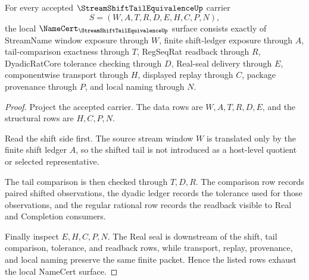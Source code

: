 \begin{theorem}
\label{thm:stream-shift-tail-equivalence-namecert-obligations}
For every accepted $\StreamShiftTailEquivalenceUp$ carrier
$$
S=(W,A,T,R,D,E,H,C,P,N),
$$
the local $\NameCert_{\StreamShiftTailEquivalenceUp}$ surface consists exactly of StreamName window exposure through $W$, finite shift-ledger exposure through $A$, tail-comparison exactness through $T$, RegSeqRat readback through $R$, DyadicRatCore tolerance checking through $D$, Real-seal delivery through $E$, componentwise transport through $H$, displayed replay through $C$, package provenance through $P$, and local naming through $N$.
\end{theorem}
\begin{proof}
Project the accepted carrier. The data rows are $W,A,T,R,D,E$, and the structural rows are $H,C,P,N$.

Read the shift side first. The source stream window $W$ is translated only by the finite shift ledger $A$, so the shifted tail is not introduced as a host-level quotient or selected representative.

The tail comparison is then checked through $T,D,R$. The comparison row records paired shifted observations, the dyadic ledger records the tolerance used for those observations, and the regular rational row records the readback visible to Real and Completion consumers.

Finally inspect $E,H,C,P,N$. The Real seal is downstream of the shift, tail comparison, tolerance, and readback rows, while transport, replay, provenance, and local naming preserve the same finite packet. Hence the listed rows exhaust the local NameCert surface.
\end{proof}

